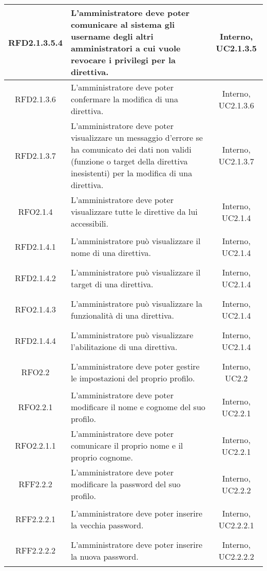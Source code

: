 \begin{longtable}{|c|>{\centering}m{7cm}|c|}
\hypertarget{RFD2.1.3.5.4}{RFD2.1.3.5.4} & L'amministratore deve poter comunicare al sistema gli username degli altri amministratori a cui vuole revocare i privilegi per la direttiva. & Interno, UC2.1.3.5\\ \hline
\hypertarget{RFD2.1.3.6}{RFD2.1.3.6} & L'amministratore deve poter confermare la modifica di una direttiva. & Interno, UC2.1.3.6\\ \hline
\hypertarget{RFD2.1.3.7}{RFD2.1.3.7} & L'amministratore deve poter visualizzare un messaggio d'errore se ha comunicato dei dati non validi (funzione o target della direttiva inesistenti) per la modifica di una direttiva. & Interno, UC2.1.3.7\\ \hline
\hypertarget{RFO2.1.4}{RFO2.1.4} & L'amministratore deve poter visualizzare tutte le direttive da lui accessibili. & Interno, UC2.1.4\\ \hline
\hypertarget{RFD2.1.4.1}{RFD2.1.4.1} & L'amministratore può visualizzare il nome di una direttiva. & Interno, UC2.1.4\\ \hline
\hypertarget{RFD2.1.4.2}{RFD2.1.4.2} & L'amministratore può visualizzare il target di una direttiva. & Interno, UC2.1.4\\ \hline
\hypertarget{RFO2.1.4.3}{RFO2.1.4.3} & L'amministratore può visualizzare la funzionalità di una direttiva. & Interno, UC2.1.4\\ \hline
\hypertarget{RFD2.1.4.4}{RFD2.1.4.4} & L'amministratore può visualizzare l'abilitazione di una direttiva. & Interno, UC2.1.4\\ \hline
\hypertarget{RFO2.2}{RFO2.2} & L'amministratore deve poter gestire le impostazioni del proprio profilo. & Interno, UC2.2\\ \hline
\hypertarget{RFO2.2.1}{RFO2.2.1} & L'amministratore deve poter modificare il nome e cognome del suo profilo. & Interno, UC2.2.1\\ \hline
\hypertarget{RFO2.2.1.1}{RFO2.2.1.1} & L'amministratore deve poter comunicare il proprio nome e il proprio cognome. & Interno, UC2.2.1\\ \hline
\hypertarget{RFF2.2.2}{RFF2.2.2} & L'amministratore deve poter modificare la password del suo profilo. & Interno, UC2.2.2\\ \hline
\hypertarget{RFF2.2.2.1}{RFF2.2.2.1} & L'amministratore deve poter inserire la vecchia password. & Interno, UC2.2.2.1\\ \hline
\hypertarget{RFF2.2.2.2}{RFF2.2.2.2} & L'amministratore deve poter inserire la nuova password. & Interno, UC2.2.2.2\\ \hline

\end{longtable}
